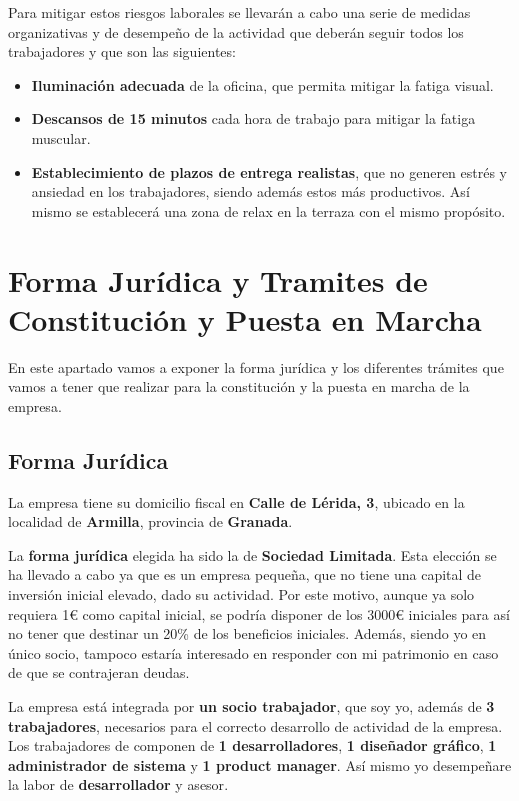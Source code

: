 Para mitigar estos riesgos laborales se llevarán a cabo una serie de medidas organizativas y de desempeño de la actividad que deberán seguir todos los trabajadores y que son las siguientes:

\begin{itemize}
    \item \textbf{Iluminación adecuada} de la oficina, que permita mitigar la fatiga visual.
    \item \textbf{Descansos de 15 minutos} cada hora de trabajo para mitigar la fatiga muscular.
    \item \textbf{Establecimiento de plazos de entrega realistas}, que no generen estrés y ansiedad en los trabajadores, siendo además
    estos más productivos. Así mismo se establecerá una zona de relax en la terraza con el mismo propósito.
\end{itemize}

\section{Forma Jurídica y Tramites de Constitución y Puesta en Marcha}
En este apartado vamos a exponer la forma jurídica y los diferentes trámites que vamos a tener que realizar para la constitución y la puesta en marcha de la empresa.

\subsection{Forma Jurídica}
La empresa tiene su domicilio fiscal en \textbf{Calle de Lérida, 3}, ubicado en la localidad de \textbf{Armilla}, provincia de \textbf{Granada}.

La \textbf{forma jurídica} elegida ha sido la de \textbf{Sociedad Limitada}. Esta elección se ha llevado a cabo ya que es un empresa pequeña, que no tiene una capital de inversión inicial elevado, dado su actividad. Por este motivo, aunque ya solo requiera 1€ como capital inicial, se podría disponer de los 3000€ iniciales para así no tener que destinar un 20\% de los beneficios iniciales. Además, siendo yo en único socio, tampoco estaría interesado en responder con mi patrimonio en caso de que se contrajeran deudas.

La empresa está integrada por \textbf{un socio trabajador}, que soy yo, además de \textbf{3 trabajadores}, necesarios para el correcto desarrollo de actividad de la empresa. Los trabajadores de componen de \textbf{1 desarrolladores}, \textbf{1 diseñador gráfico}, \textbf{1 administrador de sistema} y \textbf{1 product manager}. Así mismo yo desempeñare la labor de \textbf{desarrollador} y {asesor}.

